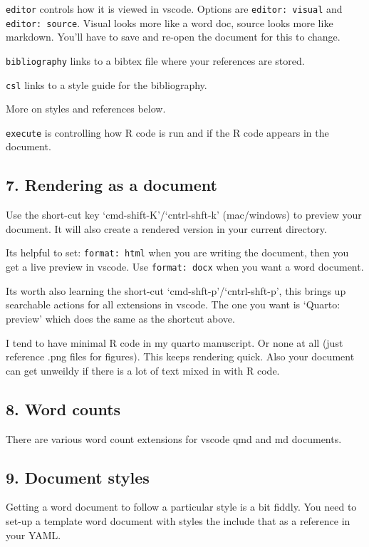 \documentclass[
  letterpaper,
  DIV=11,
  numbers=noendperiod]{scrreprt}
\begin{document}
\texttt{editor} controls how it is viewed in vscode. Options are
\texttt{editor:\ visual} and \texttt{editor:\ source}. Visual looks more
like a word doc, source looks more like markdown. You'll have to save
and re-open the document for this to change.

\texttt{bibliography} links to a bibtex file where your references are
stored.

\texttt{csl} links to a style guide for the bibliography.

More on styles and references below.

\texttt{execute} is controlling how R code is run and if the R code
appears in the document.

\subsection{7. Rendering as a document}\label{rendering-as-a-document}

Use the short-cut key `cmd-shift-K'/`cntrl-shft-k' (mac/windows) to
preview your document. It will also create a rendered version in your
current directory.

Its helpful to set: \texttt{format:\ html} when you are writing the
document, then you get a live preview in vscode. Use
\texttt{format:\ docx} when you want a word document.

Its worth also learning the short-cut `cmd-shft-p'/`cntrl-shft-p', this
brings up searchable actions for all extensions in vscode. The one you
want is `Quarto: preview' which does the same as the shortcut above.

I tend to have minimal R code in my quarto manuscript. Or none at all
(just reference .png files for figures). This keeps rendering quick.
Also your document can get unweildy if there is a lot of text mixed in
with R code.

\subsection{8. Word counts}\label{word-counts}

There are various word count extensions for vscode qmd and md documents.

\subsection{9. Document styles}\label{document-styles}

Getting a word document to follow a particular style is a bit fiddly.
You need to set-up a template word document with styles the include that
as a reference in your YAML.
\end{document}
